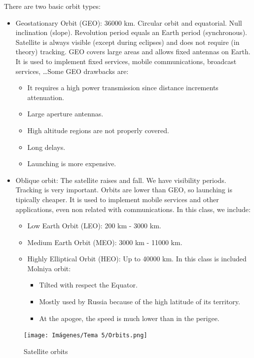 \documentclass[
	12pt,
	twoside
]{book}
\begin{document}
There are two basic orbit types:
\begin{itemize}
	\item {
		Geostationary Orbit (GEO): 36000 km. Circular orbit and equatorial. Null inclination (slope). Revolution period equals an Earth period (synchronous). Satellite is always visible (except during eclipses) and does not require (in theory) tracking. GEO covers large areas and allows fixed antennas on Earth. It is used to implement fixed services, mobile communications, broadcast services, \ldots Some GEO drawbacks are:
		\begin{itemize}
			\item It requires a high power transmission since distance increments attenuation.
			\item Large aperture antennas.
			\item High altitude regions are not properly covered.
			\item Long delays.
			\item Launching is more expensive.
		\end{itemize}
	}
	\item {
		Oblique orbit: The satellite raises and fall. We have visibility periods. Tracking is very important. Orbits are lower than GEO, so launching is tipically cheaper. It is used to implement mobile services and other applications, even non related with communications. In this class, we include:
		\begin{itemize}
			\item Low Earth Orbit (LEO): 200 km - 3000 km.
			\item Medium Earth Orbit (MEO): 3000 km - 11000 km.
			\item {
				Highly Elliptical Orbit (HEO): Up to 40000 km. In this class is included Molniya orbit:
				\begin{itemize}
					\item Tilted with respect the Equator.
					\item Mostly used by Russia because of the high latitude of its territory.
					\item At the apogee, the speed is much lower than in the perigee.
				\end{itemize}
			}
		\end{itemize}
	}
\end{itemize}

\begin{figure}[H]
	\centering
	\texttt{[image: Imágenes/Tema 5/Orbits.png]}
	\caption{
		\label{fig:unit5_orbits}
		Satellite orbits
	}
\end{figure}
\end{document}

